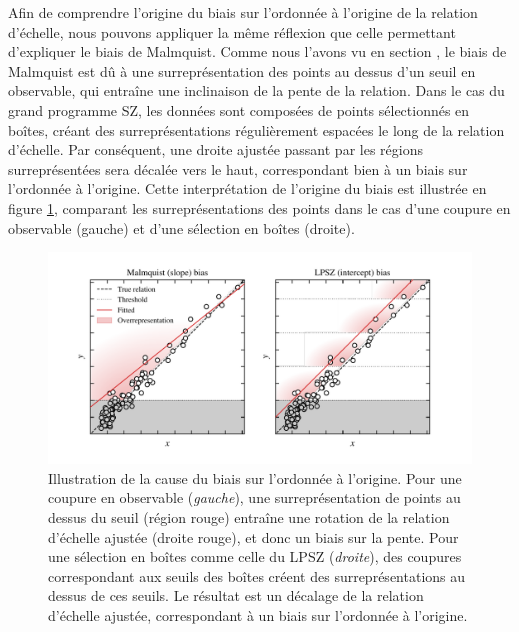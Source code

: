 Afin de comprendre l'origine du biais sur l'ordonnée à l'origine de la relation d'échelle, nous pouvons appliquer la même réflexion que celle permettant d'expliquer le biais de Malmquist.
Comme nous l'avons vu en section , le biais de Malmquist est dû à une surreprésentation des points au dessus d'un seuil en observable, qui entraîne une inclinaison de la pente de la relation.
Dans le cas du grand programme SZ, les données sont composées de points sélectionnés en boîtes, créant des surreprésentations régulièrement espacées le long de la relation d'échelle.
Par conséquent, une droite ajustée passant par les régions surreprésentées sera décalée vers le haut, correspondant bien à un biais sur l'ordonnée à l'origine.
Cette interprétation de l'origine du biais est illustrée en figure \ref{fig:scaling:intercept_bias}, comparant les surreprésentations des points dans le cas d'une coupure en observable (gauche) et d'une sélection en boîtes (droite).

\begin{figure}[t]
    \centering
    \includegraphics[width=\linewidth]{Figures/Chap_scaling/bias_intercept_illu.pdf}
    \caption{
        Illustration de la cause du biais sur l'ordonnée à l'origine.
        Pour une coupure en observable (\textit{gauche}), une surreprésentation de points au dessus du seuil (région rouge) entraîne une rotation de la relation d'échelle ajustée (droite rouge), et donc un biais sur la pente.
        Pour une sélection en boîtes comme celle du LPSZ (\textit{droite}), des coupures correspondant aux seuils des boîtes créent des surreprésentations au dessus de ces seuils.
        Le résultat est un décalage de la relation d'échelle ajustée, correspondant à un biais sur l'ordonnée à l'origine.
    }
    \label{fig:scaling:intercept_bias}
\end{figure}

